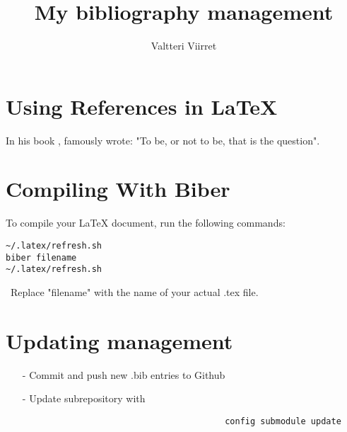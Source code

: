 \documentclass{article}
\author{Valtteri Viirret}
\title{My bibliography management}
\begin{document}
\maketitle

\section{Using References in LaTeX}

In his book \textcite{shakespeare}, famously wrote: "To be, or not to be, that is the question".

\section{Compiling With Biber}

To compile your LaTeX document, run the following commands:

\begin{verbatim}
~/.latex/refresh.sh
biber filename
~/.latex/refresh.sh
\end{verbatim}\
Replace "filename" with the name of your actual .tex file.

\section{Updating management}
\begin{itemize}
	\item[-] Commit and push new .bib entries to Github
	\item[-] Update subrepository with \begin{verbatim}
										config submodule update
										\end{verbatim}
\end{itemize}

\printbibliography
\end{document}
